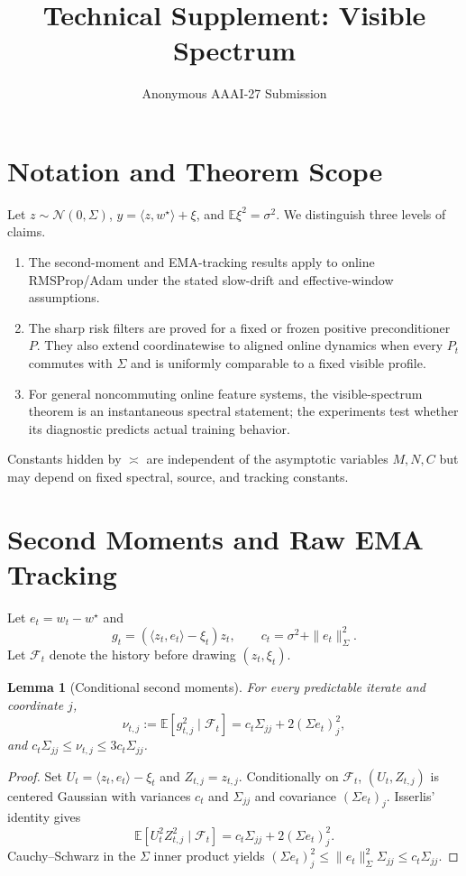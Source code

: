 \documentclass[letterpaper]{article}
\title{Technical Supplement: Visible Spectrum}
\author{Anonymous AAAI-27 Submission}
\newtheorem{lemma}{Lemma}
\newcommand{\E}{\mathbb{E}}
\newcommand{\as}{\asymp}
\begin{document}
\maketitle

\section{Notation and Theorem Scope}

Let $z\sim\mathcal N(0,\Sigma)$, $y=\langle z,w^\star\rangle+\xi$, and $\E\xi^2=\sigma^2$.  We distinguish three levels of claims.

\begin{enumerate}
 \item The second-moment and EMA-tracking results apply to online RMSProp/Adam under the stated slow-drift and effective-window assumptions.
 \item The sharp risk filters are proved for a fixed or frozen positive preconditioner $P$.  They also extend coordinatewise to aligned online dynamics when every $P_t$ commutes with $\Sigma$ and is uniformly comparable to a fixed visible profile.
 \item For general noncommuting online feature systems, the visible-spectrum theorem is an instantaneous spectral statement; the experiments test whether its diagnostic predicts actual training behavior.
\end{enumerate}

Constants hidden by $\as$ are independent of the asymptotic variables $M,N,C$ but may depend on fixed spectral, source, and tracking constants.

\section{Second Moments and Raw EMA Tracking}

Let $e_t=w_t-w^\star$ and
\[
 g_t=(\langle z_t,e_t\rangle-\xi_t)z_t,
 \qquad c_t=\sigma^2+\|e_t\|_\Sigma^2.
\]
Let $\mathcal F_t$ denote the history before drawing $(z_t,\xi_t)$.

\begin{lemma}[Conditional second moments]
\label{lem:supp-second}
For every predictable iterate and coordinate $j$,
\[
 \nu_{t,j}:=\E[g_{t,j}^2\mid\mathcal F_t]
 =c_t\Sigma_{jj}+2(\Sigma e_t)_j^2,
\]
and $c_t\Sigma_{jj}\le\nu_{t,j}\le3c_t\Sigma_{jj}$.
\end{lemma}

\begin{proof}
Set $U_t=\langle z_t,e_t\rangle-\xi_t$ and $Z_{t,j}=z_{t,j}$.  Conditionally on $\mathcal F_t$, $(U_t,Z_{t,j})$ is centered Gaussian with variances $c_t$ and $\Sigma_{jj}$ and covariance $(\Sigma e_t)_j$.  Isserlis' identity gives
\[
 \E[U_t^2Z_{t,j}^2\mid\mathcal F_t]
 =c_t\Sigma_{jj}+2(\Sigma e_t)_j^2.
\]
Cauchy--Schwarz in the $\Sigma$ inner product yields $(\Sigma e_t)_j^2\le\|e_t\|_\Sigma^2\Sigma_{jj}\le c_t\Sigma_{jj}$.
\end{proof}
\end{document}
